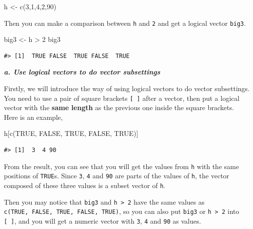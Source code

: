 \documentclass[
]{book}
\newenvironment{Shaded}{\begin{snugshade}}{\end{snugshade}}
\newcommand{\ConstantTok}[1]{\textcolor[rgb]{0.00,0.00,0.00}{#1}}
\newcommand{\DecValTok}[1]{\textcolor[rgb]{0.00,0.00,0.81}{#1}}
\newcommand{\FunctionTok}[1]{\textcolor[rgb]{0.00,0.00,0.00}{#1}}
\newcommand{\NormalTok}[1]{#1}
\newcommand{\OtherTok}[1]{\textcolor[rgb]{0.56,0.35,0.01}{#1}}
\newcommand{\SpecialCharTok}[1]{\textcolor[rgb]{0.00,0.00,0.00}{#1}}
\begin{document}
\begin{Shaded}
\begin{Highlighting}[]
\NormalTok{h }\OtherTok{\textless{}{-}} \FunctionTok{c}\NormalTok{(}\DecValTok{3}\NormalTok{,}\DecValTok{1}\NormalTok{,}\DecValTok{4}\NormalTok{,}\DecValTok{2}\NormalTok{,}\DecValTok{90}\NormalTok{)}
\end{Highlighting}
\end{Shaded}

Then you can make a comparison between \texttt{h} and \texttt{2} and get a logical vector \texttt{big3}.

\begin{Shaded}
\begin{Highlighting}[]
\NormalTok{big3 }\OtherTok{\textless{}{-}}\NormalTok{ h }\SpecialCharTok{\textgreater{}} \DecValTok{2}
\NormalTok{big3}
\end{Highlighting}
\end{Shaded}

\begin{verbatim}
#> [1]  TRUE FALSE  TRUE FALSE  TRUE
\end{verbatim}

\textbf{\emph{a. Use logical vectors to do vector subsettings}}

Firstly, we will introduce the way of using logical vectors to do vector subsettings. You need to use a pair of square brackets \texttt{{[}\ {]}} after a vector, then put a logical vector with the \textbf{same length} as the previous one inside the square brackets. Here is an example,

\begin{Shaded}
\begin{Highlighting}[]
\NormalTok{h[}\FunctionTok{c}\NormalTok{(}\ConstantTok{TRUE}\NormalTok{, }\ConstantTok{FALSE}\NormalTok{, }\ConstantTok{TRUE}\NormalTok{, }\ConstantTok{FALSE}\NormalTok{, }\ConstantTok{TRUE}\NormalTok{)]}
\end{Highlighting}
\end{Shaded}

\begin{verbatim}
#> [1]  3  4 90
\end{verbatim}

From the result, you can see that you will get the values from \texttt{h} with the same positions of \texttt{TRUE}s. Since \texttt{3}, \texttt{4} and \texttt{90} are parts of the values of \texttt{h}, the vector composed of these three values is a subset vector of \texttt{h}.

Then you may notice that \texttt{big3} and \texttt{h\ \textgreater{}\ 2} have the same values as \texttt{c(TRUE,\ FALSE,\ TRUE,\ FALSE,\ TRUE)}, so you can also put \texttt{big3} or \texttt{h\ \textgreater{}\ 2} into \texttt{{[}\ {]}}, and you will get a numeric vector with \texttt{3}, \texttt{4} and \texttt{90} as values.
\end{document}
